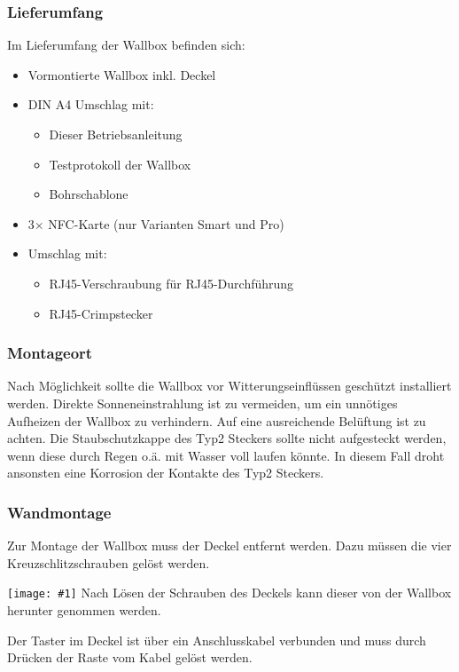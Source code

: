 \documentclass[a4paper,10pt]{article}
\newcommand{\hint}[1]{\begin{tcolorbox}[colback=boxgray,colframe=black,coltext=
white,title=Hinweis,left*=2mm,right*=2mm,boxsep=1mm,bottom=1mm,top=1mm]#1\end{tcolorbox}}
\newcommand{\gfx}[1]{\texttt{[image: \#1]}}
\begin{document}
\begin{multicols*}{2}
	\subsubsection{Lieferumfang}
	Im Lieferumfang der Wallbox befinden sich:
	\begin{itemize}
		\item Vormontierte Wallbox inkl. Deckel
		\item DIN A4 Umschlag mit:
		\begin{itemize}
			\item Dieser Betriebsanleitung
			\item Testprotokoll der Wallbox
			\item Bohrschablone
		\end{itemize}
		\item 3$\times$ NFC-Karte (nur Varianten Smart und Pro)
		\item Umschlag mit: %
		\begin{itemize}
			\item RJ45-Verschraubung für RJ45-Durchführung
			\item RJ45-Crimpstecker
		\end{itemize}
	\end{itemize}

	\subsubsection{Montageort}
	Nach Möglichkeit sollte die Wallbox vor Witterungseinflüssen geschützt
	installiert werden. Direkte Sonneneinstrahlung ist zu vermeiden, um ein
	unnötiges Aufheizen der Wallbox zu verhindern. Auf eine ausreichende Belüftung
	ist zu achten. Die Staubschutzkappe des Typ2 Steckers sollte nicht aufgesteckt
	werden, wenn diese durch Regen o.ä. mit Wasser voll laufen könnte. In diesem Fall
	droht ansonsten eine Korrosion der Kontakte des Typ2 Steckers.

	\subsubsection{Wandmontage}\label{wandmontage}
	Zur Montage der Wallbox muss der Deckel entfernt werden. Dazu müssen die
	vier Kreuzschlitzschrauben gelöst werden.

	\gfx{./img_warp2/resized/warp_screw_points_ready}
	Nach Lösen der Schrauben des Deckels kann dieser von der Wallbox herunter genommen
	werden.

	\hint{Der Taster im Deckel ist über ein Anschlusskabel verbunden und muss
		durch Drücken der Raste vom Kabel gelöst werden.}


\end{multicols*}
\end{document}

